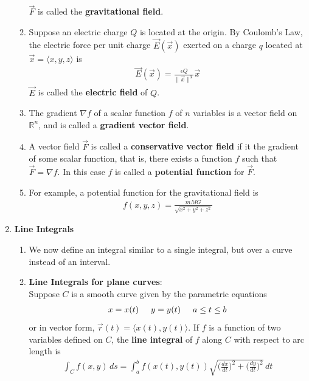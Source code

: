\documentclass[10pt]{article}
\begin{document}
\begin{multicols}{2}
\begin{enumerate}
\begin{enumerate}
        $\vec{F}$ is called the \textbf{gravitational field}.
        \item Suppose an electric charge $Q$ is located at the origin. By Coulomb's Law, the electric force per unit charge $\vec{E}(\vec{x})$ exerted on a charge $q$ located at $\vec{x} = \langle x,y,z \rangle$ is
        \begin{align*}
            \vec{E}(\vec{x}) = \frac{\epsilon Q}{\| \vec{x} \|^3} \vec{x}
        \end{align*}
        $\vec{E}$ is called the \textbf{electric field} of $Q$.
        \item The gradient $\nabla f$ of a scalar function $f$ of $n$ variables is a vector field on $\mathbb{R}^n$, and is called a \textbf{gradient vector field}.
        \item A vector field $\vec{F}$ is called a \textbf{conservative vector field} if it the gradient of some scalar function, that is, there exists a function $f$ such that $\vec{F} = \nabla f$. In this case $f$ is called a \textbf{potential function} for $\vec{F}$. 
        \item For example, a potential function for the gravitational field is
        \begin{align*}
            f(x,y,z) = \frac{mMG}{\sqrt{x^2 + y^2 + z^2}}
        \end{align*}
    \end{enumerate}
    \item \textbf{Line Integrals}
    \begin{enumerate}
        \item We now define an integral similar to a single integral, but over a curve instead of an interval. 
        \item \textbf{Line Integrals for plane curves}: \\ Suppose $C$ is a smooth curve given by the parametric equations
        \begin{align*}
            x=x(t) \hspace{5mm} y=y(t) \hspace{5mm} a \leq t \leq b
        \end{align*}
        or in vector form, $\vec{r}(t) = \langle x(t), y(t) \rangle$.
        If $f$ is a function of two variables defined on $C$, the \textbf{line integral} of $f$ along $C$ with respect to arc length is
        \begin{align*}
            \int_C f(x,y) \,ds = \int_a^b f(x(t), y(t)) \sqrt{ \biggl(\frac{dx}{dt}\biggr)^{\!2} + \biggl(\frac{dy}{dt}\biggr)^{\!2}} \, dt

\end{align*}
\end{enumerate}
\end{enumerate}
\end{multicols}
\end{document}

